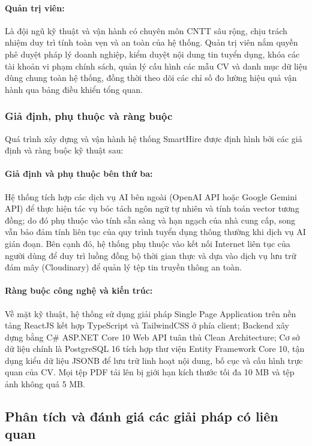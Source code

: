 \paragraph{Quản trị viên:}
Là đội ngũ kỹ thuật và vận hành có chuyên môn CNTT sâu rộng, chịu trách nhiệm duy trì tính toàn vẹn và an toàn của hệ thống. Quản trị viên nắm quyền phê duyệt pháp lý doanh nghiệp, kiểm duyệt nội dung tin tuyển dụng, khóa các tài khoản vi phạm chính sách, quản lý cấu hình các mẫu CV và danh mục dữ liệu dùng chung toàn hệ thống, đồng thời theo dõi các chỉ số đo lường hiệu quả vận hành qua bảng điều khiển tổng quan.

\subsubsection{Giả định, phụ thuộc và ràng buộc}
Quá trình xây dựng và vận hành hệ thống SmartHire được định hình bởi các giả định và ràng buộc kỹ thuật sau:

\paragraph{Giả định và phụ thuộc bên thứ ba:}
Hệ thống tích hợp các dịch vụ AI bên ngoài (OpenAI API hoặc Google Gemini API) để thực hiện tác vụ bóc tách ngôn ngữ tự nhiên và tính toán vector tương đồng; do đó phụ thuộc vào tính sẵn sàng và hạn ngạch của nhà cung cấp, song vẫn bảo đảm tính liên tục của quy trình tuyển dụng thông thường khi dịch vụ AI gián đoạn. Bên cạnh đó, hệ thống phụ thuộc vào kết nối Internet liên tục của người dùng để duy trì luồng đồng bộ thời gian thực và dựa vào dịch vụ lưu trữ đám mây (Cloudinary) để quản lý tệp tin truyền thông an toàn.

\paragraph{Ràng buộc công nghệ và kiến trúc:}
Về mặt kỹ thuật, hệ thống sử dụng giải pháp Single Page Application trên nền tảng ReactJS kết hợp TypeScript và TailwindCSS ở phía client; Backend xây dựng bằng C\# ASP.NET Core 10 Web API tuân thủ Clean Architecture; Cơ sở dữ liệu chính là PostgreSQL 16 tích hợp thư viện Entity Framework Core 10, tận dụng kiểu dữ liệu JSONB để lưu trữ linh hoạt nội dung, bố cục và cấu hình trực quan của CV. Mọi tệp PDF tải lên bị giới hạn kích thước tối đa 10 MB và tệp ảnh không quá 5 MB.

\subsection{Phân tích và đánh giá các giải pháp có liên quan}


